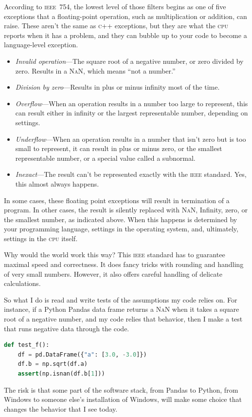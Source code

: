 \documentclass[fleqn,10pt]{olplainarticle}
\newcommand{\cpp}{\textsc{c}++\xspace}
\newcommand{\cpu}{\textsc{cpu}\xspace}
\newcommand{\nan}{\textsc{NaN}\xspace}
\newcommand{\ieee}{\textsc{ieee}\xspace}
\begin{document}
According to \ieee~754, the lowest level of those filters begins
as one of five exceptions that a floating-point
operation, such as multiplication or addition, can raise. These aren't the
same as \cpp exceptions, but they are what the \cpu reports when
it has a problem, and they can bubble up to your code to become a
language-level exception.
\begin{itemize}
    \item \emph{Invalid operation}---The square root of a negative
    number, or zero divided by zero. Results in a \nan, which means
    ``not a number.''
    \item \emph{Division by zero}---Results in plus or minus infinity most
    of the time.
    \item \emph{Overflow}---When an operation results in a number
    too large to represent, this can result either in infinity
    or the largest representable number, depending on settings.
    \item \emph{Underflow}---When an operation results in a number
    that isn't zero but is too small to represent, it can result
    in plus or minus zero, or the smallest representable number,
    or a special value called a subnormal.
    \item \emph{Inexact}---The result can't be represented exactly
    with the \ieee standard. Yes, this almost always happens.
\end{itemize}
In some cases, these floating point exceptions will result in termination
of a program. In other cases, the result is silently replaced
with \nan, Infinity, zero, or the smallest number, as indicated above.
When this happens is determined by your programming language,
settings in the operating system, and, ultimately, settings
in the \cpu itself.

Why would the world work this way? This \ieee standard has to guarantee
maximal speed and correctness. It does fancy tricks with rounding
and handling of very small numbers. However, it also offers
careful handling of delicate calculations.

So what I do is read \cite{overton2001numerical} and write tests
of the assumptions my code relies on.
For instance, if a Python Pandas data frame returns a \nan when it
takes a square root of a negative number, and my code relies that behavior,
then I make a test that runs negative data through the code.
\begin{lstlisting}[language=Python]
def test_f():
    df = pd.DataFrame({"a": [3.0, -3.0]})
    df.b = np.sqrt(df.a)
    assert(np.isnan(df.b[1]))
\end{lstlisting}
The risk is that some part of the software stack, from Pandas to Python, from
Windows to someone else's installation of Windows,
will make some choice that changes the behavior that I see today.
\end{document}
